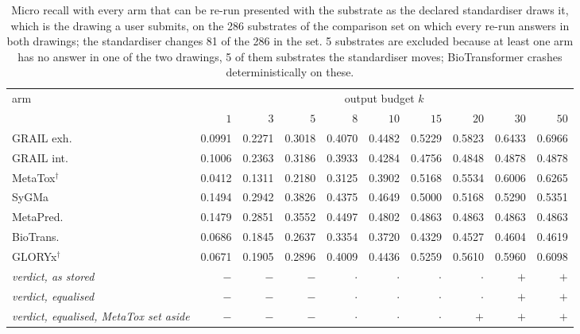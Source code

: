 \begin{table}[t]
\centering\scriptsize
\begin{threeparttable}
\caption{Micro recall with every arm that can be re-run presented with the substrate as the declared standardiser draws it, which is the drawing a user submits, on the 286 substrates of the comparison set on which every re-run answers in both drawings; the standardiser changes 81 of the 286 in the set. 5 substrates are excluded because at least one arm has no answer in one of the two drawings, 5 of them substrates the standardiser moves; BioTransformer crashes deterministically on these.}
\label{tab:si-equalised}
\begin{tabular}{lrrrrrrrrr}
\toprule
arm & \multicolumn{9}{c}{output budget $k$} \\
\cmidrule(lr){2-10}
 & $1$ & $3$ & $5$ & $8$ & $10$ & $15$ & $20$ & $30$ & $50$ \\
\midrule
GRAIL exh. & 0.0991 & 0.2271 & 0.3018 & 0.4070 & 0.4482 & 0.5229 & 0.5823 & 0.6433 & 0.6966 \\
GRAIL int. & 0.1006 & 0.2363 & 0.3186 & 0.3933 & 0.4284 & 0.4756 & 0.4848 & 0.4878 & 0.4878 \\
MetaTox$^{\dagger}$ & 0.0412 & 0.1311 & 0.2180 & 0.3125 & 0.3902 & 0.5168 & 0.5534 & 0.6006 & 0.6265 \\
SyGMa & 0.1494 & 0.2942 & 0.3826 & 0.4375 & 0.4649 & 0.5000 & 0.5168 & 0.5290 & 0.5351 \\
MetaPred. & 0.1479 & 0.2851 & 0.3552 & 0.4497 & 0.4802 & 0.4863 & 0.4863 & 0.4863 & 0.4863 \\
BioTrans. & 0.0686 & 0.1845 & 0.2637 & 0.3354 & 0.3720 & 0.4329 & 0.4527 & 0.4604 & 0.4619 \\
GLORYx$^{\dagger}$ & 0.0671 & 0.1905 & 0.2896 & 0.4009 & 0.4436 & 0.5259 & 0.5610 & 0.5960 & 0.6098 \\
\midrule
\emph{verdict, as stored} & $-$ & $-$ & $-$ & $\cdot$ & $\cdot$ & $\cdot$ & $\cdot$ & $+$ & $+$ \\
\emph{verdict, equalised} & $-$ & $-$ & $-$ & $\cdot$ & $\cdot$ & $\cdot$ & $\cdot$ & $+$ & $+$ \\
\emph{verdict, equalised, MetaTox set aside} & $-$ & $-$ & $-$ & $\cdot$ & $\cdot$ & $\cdot$ & $+$ & $+$ & $+$ \\
\bottomrule
\end{tabular}
\begin{tablenotes}[flushleft]\footnotesize

\end{tablenotes}
\end{threeparttable}
\end{table}
